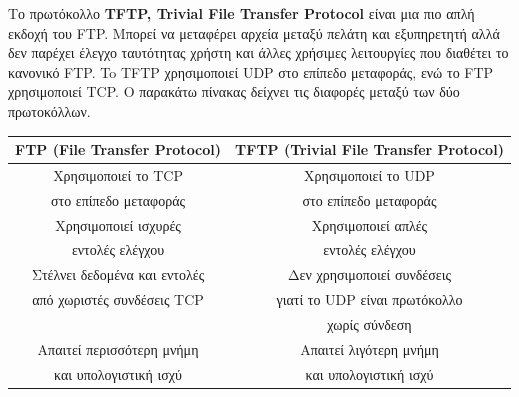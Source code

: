Το πρωτόκολλο \textbf{TFTP, Trivial File Transfer Protocol} είναι μια πιο απλή εκδοχή του FTP. Μπορεί να μεταφέρει αρχεία μεταξύ πελάτη και εξυπηρετητή αλλά δεν παρέχει έλεγχο ταυτότητας χρήστη και άλλες χρήσιμες λειτουργίες που διαθέτει το κανονικό FTP. To TFTP χρησιμοποιεί UDP στο επίπεδο μεταφοράς, ενώ το FTP χρησιμοποιεί TCP. O παρακάτω πίνακας δείχνει τις διαφορές μεταξύ των δύο πρωτοκόλλων.

\begin{tabular}{|c|c|}
\hline
\textbf{FTP (File Transfer Protocol)} & \textbf{TFTP (Trivial File Transfer Protocol)} \\
\hline
Χρησιμοποιεί το TCP & Χρησιμοποιεί το UDP    \\
στο επίπεδο μεταφοράς & στο επίπεδο μεταφοράς \\
\hline
Χρησιμοποιεί ισχυρές & Χρησιμοποιεί απλές \\
 εντολές ελέγχου &  εντολές ελέγχου \\
\hline
Στέλνει δεδομένα και εντολές & Δεν χρησιμοποιεί συνδέσεις \\
από χωριστές συνδέσεις TCP   & γιατί το UDP είναι πρωτόκολλο \\
& χωρίς σύνδεση \\
\hline
Απαιτεί περισσότερη μνήμη & Απαιτεί λιγότερη μνήμη \\ 
και υπολογιστική ισχύ &  και υπολογιστική ισχύ \\
\hline
\end{tabular}